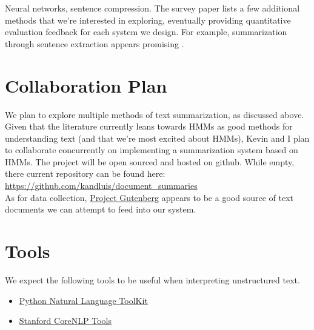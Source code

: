 \documentclass[10pt]{article}
\begin{document}
Neural networks, sentence compression. The survey paper lists a few additional methods that we’re interested in exploring, eventually providing quantitative evaluation feedback for each system we design. For example, summarization through sentence extraction appears promising \cite{sentence_summary}.


\section{Collaboration Plan}
We plan to explore multiple methods of text summarization, as discussed above. Given that the literature currently leans towards HMMs as good methods for understanding text (and that we’re most excited about HMMs), Kevin and I plan to collaborate concurrently on implementing a summarization system based on HMMs. The project will be open sourced and hosted on github. While empty, there current repository can be found here: \href{https://github.com/kandluis/document_summaries}{https://github.com/kandluis/document\_summaries} \\

As for data collection, \href{https://archive.org/details/gutenberg}{Project Gutenberg} appears to be a good source of text documents we can attempt to feed into our system.

\section{Tools}
We expect the following tools to be useful when interpreting unstructured text.
\begin{itemize}
\item \href{http://www.nltk.org/}{Python Natural Language ToolKit}
\item \href{http://nlp.stanford.edu/software/corenlp.shtml}{Stanford CoreNLP Tools}
\end{itemize}

\nocite {hmm_summary}


\end{document}
